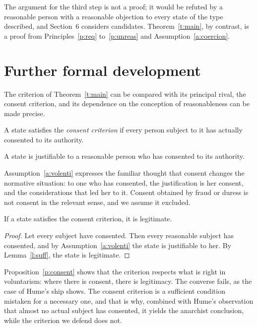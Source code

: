 \documentclass{situationist-preprint}
\begin{document}
The argument for the third step is not a proof; it would be refuted by a reasonable person with a reasonable objection to every state of the type described, and Section~6 considers candidates. Theorem~\ref{t:main}, by contrast, is a proof from Principles~\ref{p:req} to~\ref{p:unreas} and Assumption~\ref{a:coercion}.

\section{Further formal development}

The criterion of Theorem~\ref{t:main} can be compared with its principal rival, the consent criterion, and its dependence on the conception of reasonableness can be made precise.

\begin{definition}\label{d:consent}
A state satisfies the \emph{consent criterion} if every person subject to it has actually consented to its authority.
\end{definition}

\begin{assumption}[Volenti]\label{a:volenti}
A state is justifiable to a reasonable person who has consented to its authority.
\end{assumption}

Assumption~\ref{a:volenti} expresses the familiar thought that consent changes the normative situation: to one who has consented, the justification is her consent, and the considerations that led her to it. Consent obtained by fraud or duress is not consent in the relevant sense, and we assume it excluded.

\begin{proposition}\label{p:consent}
If a state satisfies the consent criterion, it is legitimate.
\end{proposition}

\begin{proof}
Let every subject have consented. Then every reasonable subject has consented, and by Assumption~\ref{a:volenti} the state is justifiable to her. By Lemma~\ref{l:suff}, the state is legitimate.
\end{proof}

Proposition~\ref{p:consent} shows that the criterion respects what is right in voluntarism: where there is consent, there is legitimacy. The converse fails, as the case of Hume's ship shows. The consent criterion is a sufficient condition mistaken for a necessary one, and that is why, combined with Hume's observation that almost no actual subject has consented, it yields the anarchist conclusion, while the criterion we defend does not.
\end{document}
